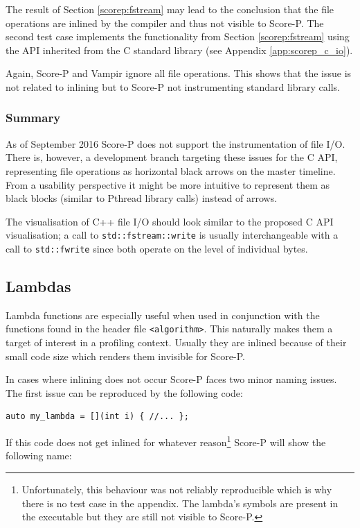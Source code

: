 The result of Section \ref{scorep:fstream} may lead to the conclusion that the file operations are inlined by the compiler and thus not visible to Score-P. The second test case implements the functionality from Section \ref{scorep:fstream} using the API inherited from the C standard library (see Appendix \ref{app:scorep_c_io}).

Again, Score-P and Vampir ignore all file operations. This shows that the issue is not related to inlining but to Score-P not instrumenting standard library calls.

\subsubsection{Summary}

As of September 2016 Score-P does not support the instrumentation of file I/O. There is, however, a development branch targeting these issues for the C API, representing file operations as horizontal black arrows on the master timeline. From a usability perspective it might be more intuitive to represent them as black blocks (similar to Pthread library calls) instead of arrows.

The visualisation of C++ file I/O should look similar to the proposed C API visualisation; a call to \texttt{std::fstream::write} is usually interchangeable with a call to \texttt{std::fwrite} since both operate on the level of individual bytes.

\subsection{Lambdas}

Lambda functions are especially useful when used in conjunction with the functions found in the header file \texttt{<algorithm>}. This naturally makes them a target of interest in a profiling context. Usually they are inlined because of their small code size which renders them invisible for Score-P.

In cases where inlining does not occur Score-P faces two minor naming issues. The first issue can be reproduced by the following code:

\begin{verbatim}
auto my_lambda = [](int i) { //... };
\end{verbatim}

If this code does not get inlined for whatever reason\footnote{Unfortunately, this behaviour was not reliably reproducible which is why there is no test case in the appendix. The lambda's symbols are present in the executable but they are still not visible to Score-P.} Score-P will show the following name:


